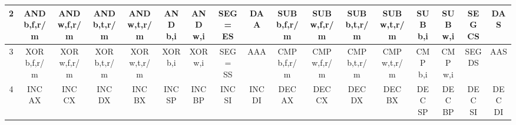 {\begin{longtable}{|c|c|c|c|c|c|c|c|c|c|c|c|c|c|c|c|c|}
\hline
2 & \makecell{AND\\b,f,r/m} & \makecell{AND\\w,f,r/m} & \makecell{AND\\b,t,r/m} & \makecell{AND\\w,t,r/m} & \makecell{AND\\b,i} & \makecell{AND\\w,i} & \makecell{SEG=\\ES} & DAA & \makecell{SUB\\b,f,r/m} & \makecell{SUB\\w,f,r/m} & \makecell{SUB\\b,t,r/m} & \makecell{SUB\\w,t,r/m} & \makecell{SUB\\b,i} & \makecell{SUB\\w,i} & \makecell{SEG\\CS} & DAS \\
\hline
3 & \makecell{XOR\\b,f,r/m} & \makecell{XOR\\w,f,r/m} & \makecell{XOR\\b,t,r/m} & \makecell{XOR\\w,t,r/m} & \makecell{XOR\\b,i} & \makecell{XOR\\w,i} & \makecell{SEG=\\SS} & AAA & \makecell{CMP\\b,f,r/m} & \makecell{CMP\\w,f,r/m} & \makecell{CMP\\b,t,r/m} & \makecell{CMP\\w,t,r/m} & \makecell{CMP\\b,i} & \makecell{CMP\\w,i} & \makecell{SEG\\DS} & AAS \\
\hline
4 & \makecell{INC\\AX} & \makecell{INC\\CX} & \makecell{INC\\DX} & \makecell{INC\\BX} & \makecell{INC\\SP} & \makecell{INC\\BP} & \makecell{INC\\SI} & \makecell{INC\\DI} & \makecell{DEC\\AX} & \makecell{DEC\\CX} & \makecell{DEC\\DX} & \makecell{DEC\\BX} & \makecell{DEC\\SP} & \makecell{DEC\\BP} & \makecell{DEC\\SI} & \makecell{DEC\\DI} \\

\end{longtable}}
